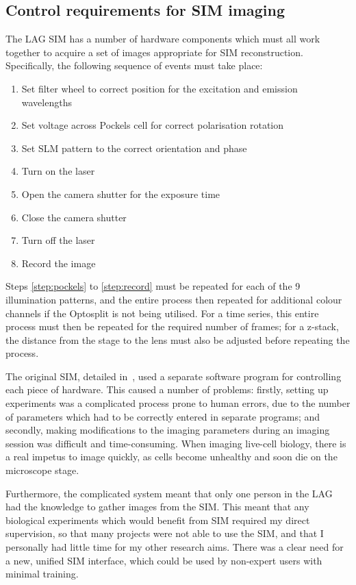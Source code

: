 \subsection{Control requirements for SIM imaging} \label{sec:SIMsteps}
The LAG SIM has a number of hardware components which must all work together to acquire a set of images appropriate for SIM reconstruction.
Specifically, the following sequence of events must take place:
\begin{enumerate}
	\item Set filter wheel to correct position for the excitation and emission wavelengths
	\item\label{step:pockels} Set voltage across Pockels cell for correct polarisation rotation
	\item Set SLM pattern to the correct orientation and phase
	\item Turn on the laser
	\item Open the camera shutter for the exposure time
	\item Close the camera shutter
	\item Turn off the laser
	\item\label{step:record} Record the image
\end{enumerate}
Steps \ref{step:pockels} to \ref{step:record} must be repeated for each of the 9 illumination patterns, and the entire process then repeated for additional colour channels if the Optosplit is not being utilised.
For a time series, this entire process must then be repeated for the required number of frames; for a z-stack, the distance from the stage to the lens must also be adjusted before repeating the process.

The original SIM, detailed in~\cite{young2016guide}, used a separate software program for controlling each piece of hardware.
This caused a number of problems: firstly, setting up experiments was a complicated process prone to human errors, due to the number of parameters which had to be correctly entered in separate programs; and secondly, making modifications to the imaging parameters during an imaging session was difficult and time-consuming.
When imaging live-cell biology, there is a real impetus to image quickly, as cells become unhealthy and soon die on the microscope stage.

Furthermore, the complicated system meant that only one person in the LAG had the knowledge to gather images from the SIM.
This meant that any biological experiments which would benefit from SIM required my direct supervision, so that many projects were not able to use the SIM, and that I personally had little time for my other research aims.
There was a clear need for a new, unified SIM interface, which could be used by non-expert users with minimal training.

